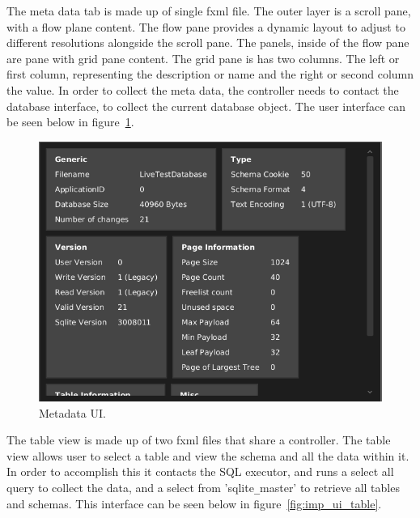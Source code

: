 The meta data tab is made up of single fxml file. The outer layer is a scroll pane, with a flow plane content. The flow pane provides a dynamic layout to adjust to different resolutions alongside the scroll pane. The panels, inside of the flow pane are pane with grid pane content. The grid pane is has two columns. The left or first column, representing the description or name and the right or second column the value. In order to collect the meta data, the controller needs to contact the database interface, to collect the current database object. The user interface can be seen below in figure~\ref{fig:ui_imp_metdata}.

\begin{figure}[H]
	\centering
	\includegraphics[scale=0.32]{images/ui_meatadata_final.png}
	\caption{Metadata UI.}
	\label{fig:ui_imp_metdata}
\end{figure}

The table view is made up of two fxml files that share a controller. The table view allows user to select a  table and view the schema and all the data within it. In order to accomplish this it contacts the SQL executor, and runs a select all query to collect the data, and a select from 'sqlite\verb|_|master' to retrieve all tables and schemas. This interface can be seen below in figure~\ref{fig:imp_ui_table}.

